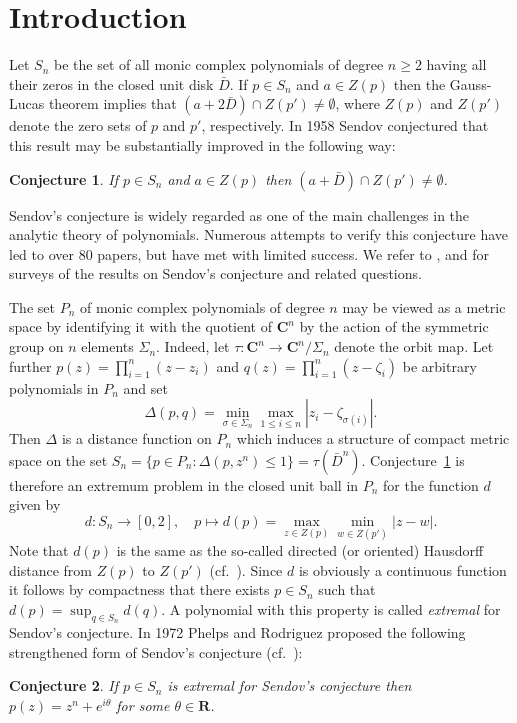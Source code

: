\documentclass[10pt,twoside,a4paper,reqno]{amsart}
\theoremstyle{plain}
\newtheorem{conjecture}   {Conjecture}
\theoremstyle{definition}
\begin{document}
\section*{Introduction}
{\allowdisplaybreaks
Let $S_{n}$ be the set of all monic complex polynomials of degree 
$n\ge 2$ having all their zeros in the closed unit disk $\bar{D}$. If 
$p\in S_{n}$ and 
$a\in Z(p)$ then the Gauss-Lucas theorem implies that 
$(a+2\bar{D})\cap Z(p')\neq \emptyset$, where $Z(p)$ and $Z(p')$ denote the 
zero sets of $p$ and $p'$, respectively. In 1958 Sendov conjectured that 
this result may be substantially improved in the following way:
\begin{conjecture}\label{send1}
If $p\in S_{n}$ and $a\in Z(p)$ then $(a+\bar{D})\cap Z(p')\neq \emptyset$.
\end{conjecture}
Sendov's conjecture is widely regarded as one of the main challenges in the 
analytic theory of polynomials. Numerous attempts to verify this conjecture 
have led to over 80 papers, but have met with limited success. We refer to 
\cite{RS}, \cite{Se} and \cite{Sh} for surveys of the results on Sendov's 
conjecture and related questions.

The set $P_n$ of monic complex polynomials of degree $n$ may be 
viewed as a metric space by identifying it with the quotient of 
$\mathbf{C}^n$ by the action of the symmetric group on $n$ elements 
$\Sigma_n$. Indeed, let $\tau:\mathbf{C}^n\rightarrow \mathbf{C}^n/\Sigma_n$ 
denote the orbit map. Let further $p(z)=\prod_{i=1}^{n}(z-z_i)$ and 
$q(z)=\prod_{i=1}^{n}(z-\zeta_i)$ be arbitrary polynomials in $P_n$ and set
$$\Delta(p,q)=
\min_{\sigma\in \Sigma_n}\max_{1\le i\le n}|z_i-\zeta_{\sigma(i)}|.$$
Then $\Delta$ is a distance function on $P_n$ which 
induces a structure of compact metric space on the set 
$S_n=\{p\in P_n:\Delta(p,z^n)\le 1\}=\tau(\bar{D}^n)$. 
Conjecture~\ref{send1} is therefore an extremum problem 
in the closed unit ball in $P_n$ for the function $d$ given by
$$d:S_{n}\rightarrow [0,2],
\quad p\mapsto d(p)=\max_{z\in Z(p)}\min_{w\in Z(p')}|z-w|.$$
Note that $d(p)$ is the same as the so-called directed (or oriented) 
Hausdorff distance from $Z(p)$ to $Z(p')$ (cf.~\cite{Se}). Since $d$ is 
obviously a continuous function it follows by compactness that 
there exists $p\in S_{n}$ such that $d(p)=\sup_{q\in S_{n}}d(q)$. A 
polynomial with this property is called {\em extremal} for Sendov's 
conjecture. In 1972 Phelps and Rodriguez proposed the following strengthened 
form of Sendov's conjecture (cf.~\cite{PR}):
\begin{conjecture}\label{send2}
If $p\in S_{n}$ is extremal for Sendov's conjecture then 
$p(z)=z^n+e^{i\theta}$ for some $\theta \in \mathbf{R}$.
\end{conjecture}

}
\end{document}
